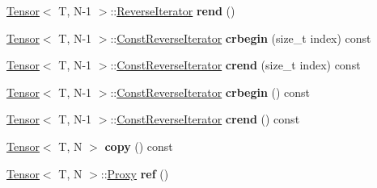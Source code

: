 \begin{DoxyCompactItemize}
\item 
\hyperlink{classtensor_1_1Tensor}{Tensor}$<$ T, N-\/1 $>$\+::\hyperlink{classtensor_1_1Tensor_1_1ReverseIterator}{Reverse\+Iterator} {\bfseries rend} ()\hypertarget{classtensor_1_1Tensor_ace8b93e9269b5748ecb8543bd2343eda}{}\label{classtensor_1_1Tensor_ace8b93e9269b5748ecb8543bd2343eda}

\item 
\hyperlink{classtensor_1_1Tensor}{Tensor}$<$ T, N-\/1 $>$\+::\hyperlink{classtensor_1_1Tensor_1_1ConstReverseIterator}{Const\+Reverse\+Iterator} {\bfseries crbegin} (size\+\_\+t index) const \hypertarget{classtensor_1_1Tensor_ab4bde01ee6586116ba859a7532dbb284}{}\label{classtensor_1_1Tensor_ab4bde01ee6586116ba859a7532dbb284}

\item 
\hyperlink{classtensor_1_1Tensor}{Tensor}$<$ T, N-\/1 $>$\+::\hyperlink{classtensor_1_1Tensor_1_1ConstReverseIterator}{Const\+Reverse\+Iterator} {\bfseries crend} (size\+\_\+t index) const \hypertarget{classtensor_1_1Tensor_a4abc5e8335802d42ddb1988cd0cc7c7e}{}\label{classtensor_1_1Tensor_a4abc5e8335802d42ddb1988cd0cc7c7e}

\item 
\hyperlink{classtensor_1_1Tensor}{Tensor}$<$ T, N-\/1 $>$\+::\hyperlink{classtensor_1_1Tensor_1_1ConstReverseIterator}{Const\+Reverse\+Iterator} {\bfseries crbegin} () const \hypertarget{classtensor_1_1Tensor_ae617ee395934f8bf2ba785875fa7d70b}{}\label{classtensor_1_1Tensor_ae617ee395934f8bf2ba785875fa7d70b}

\item 
\hyperlink{classtensor_1_1Tensor}{Tensor}$<$ T, N-\/1 $>$\+::\hyperlink{classtensor_1_1Tensor_1_1ConstReverseIterator}{Const\+Reverse\+Iterator} {\bfseries crend} () const \hypertarget{classtensor_1_1Tensor_af5395bfa0f7d78ab04475b0e04326295}{}\label{classtensor_1_1Tensor_af5395bfa0f7d78ab04475b0e04326295}

\item 
\hyperlink{classtensor_1_1Tensor}{Tensor}$<$ T, N $>$ {\bfseries copy} () const \hypertarget{classtensor_1_1Tensor_a9c9c8e37fa8b71d1e76f735404ddf3ed}{}\label{classtensor_1_1Tensor_a9c9c8e37fa8b71d1e76f735404ddf3ed}

\item 
\hyperlink{classtensor_1_1Tensor}{Tensor}$<$ T, N $>$\+::\hyperlink{classtensor_1_1Tensor_1_1Proxy}{Proxy} {\bfseries ref} ()\hypertarget{classtensor_1_1Tensor_a231c1f016e88fdd78b6ed08dc6b837d9}{}\label{classtensor_1_1Tensor_a231c1f016e88fdd78b6ed08dc6b837d9}

\end{DoxyCompactItemize}

